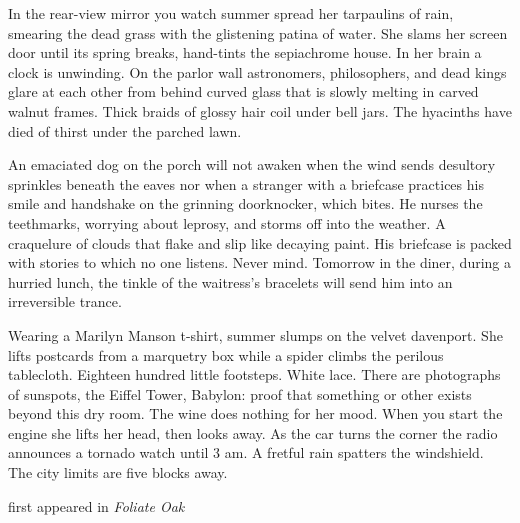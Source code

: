 In the rear-view mirror you watch summer spread her tarpaulins of rain,
smearing the dead grass with the glistening patina of water. She slams
her screen door until its spring breaks, hand-tints the sepiachrome
house. In her brain a clock is unwinding. On the parlor wall
astronomers, philosophers, and dead kings glare at each other from
behind curved glass that is slowly melting in carved walnut frames.
Thick braids of glossy hair coil under bell jars. The hyacinths have
died of thirst under the parched lawn.

An emaciated dog on the porch will not awaken when the wind sends
desultory sprinkles beneath the eaves nor when a stranger with a
briefcase practices his smile and handshake on the grinning doorknocker,
which bites. He nurses the teethmarks, worrying about leprosy, and
storms off into the weather. A craquelure of clouds that flake and slip
like decaying paint. His briefcase is packed with stories to which no
one listens. Never mind. Tomorrow in the diner, during a hurried lunch,
the tinkle of the waitress's bracelets will send him into an
irreversible trance.

Wearing a Marilyn Manson t-shirt, summer slumps on the velvet davenport.
She lifts postcards from a marquetry box while a spider climbs the
perilous tablecloth. Eighteen hundred little footsteps. White lace.
There are photographs of sunspots, the Eiffel Tower, Babylon: proof that
something or other exists beyond this dry room. The wine does nothing
for her mood. When you start the engine she lifts her head, then looks
away. As the car turns the corner the radio announces a tornado watch
until 3 am. A fretful rain spatters the windshield. The city limits are
five blocks away.

first appeared in \emph{Foliate Oak}
